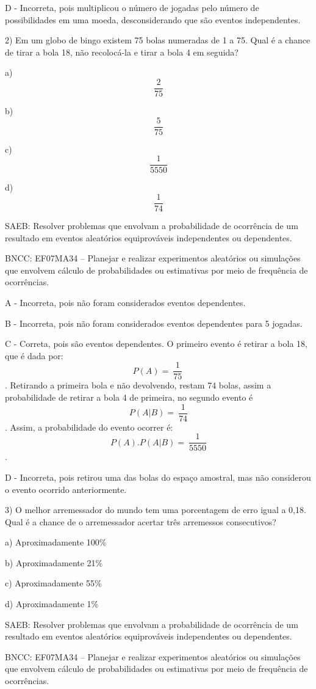D - Incorreta, pois multiplicou o número de jogadas pelo número de
possibilidades em uma moeda, desconsiderando que são eventos
independentes.

2) Em um globo de bingo existem 75 bolas numeradas de 1 a 75. Qual é a
chance de tirar a bola 18, não recolocá-la e tirar a bola 4 em seguida?

a) \[\frac{2}{75}\]

b) \[\frac{5}{75}\]

c) \[\frac{1}{5550}\]

d) \[\frac{1}{74}\]

SAEB: Resolver problemas que envolvam a probabilidade de ocorrência de
um resultado em eventos aleatórios equiprováveis independentes ou
dependentes.

BNCC: EF07MA34 -- Planejar e realizar experimentos aleatórios ou
simulações que envolvem cálculo de probabilidades ou estimativas por
meio de frequência de ocorrências.

A - Incorreta, pois não foram considerados eventos dependentes.

B - Incorreta, pois não foram considerados eventos dependentes para 5
jogadas.

C - Correta, pois são eventos dependentes. O primeiro evento é retirar a
bola 18, que é dada por: \[P(A) = \ \frac{1}{75}\ \]. Retirando a
primeira bola e não devolvendo, restam 74 bolas, assim a probabilidade
de retirar a bola 4 de primeira, no segundo evento é
\[P(A|B) = \ \frac{1}{74}\]. Assim, a probabilidade do evento ocorrer é:
\[P(A).P(A|B) = \ \frac{1}{5550}\].

D - Incorreta, pois retirou uma das bolas do espaço amostral, mas não
considerou o evento ocorrido anteriormente.

3) O melhor arremessador do mundo tem uma porcentagem de erro igual a
0,18. Qual é a chance de o arremessador acertar três arremessos
consecutivos?

a) Aproximadamente 100\%

b) Aproximadamente 21\%

c) Aproximadamente 55\%

d) Aproximadamente 1\%

SAEB: Resolver problemas que envolvam a probabilidade de ocorrência de
um resultado em eventos aleatórios equiprováveis independentes ou
dependentes.

BNCC: EF07MA34 -- Planejar e realizar experimentos aleatórios ou
simulações que envolvem cálculo de probabilidades ou estimativas por
meio de frequência de ocorrências.

